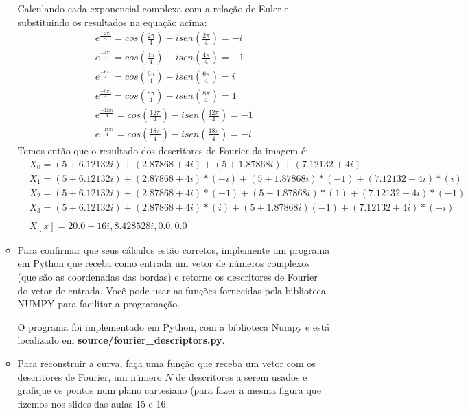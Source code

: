 \documentclass[12pt]{article}
\begin{document}
\begin{itemize}
\begin{itemize}
Calculando cada exponencial complexa com a relação de Euler e substituindo os resultados na equação acima:
\begin{align*}
    &e^{\frac{-2\pi i}{4}} = cos(\frac{2\pi}{4}) - isen(\frac{2\pi}{4}) = -i &\\
    &e^{\frac{-4\pi i}{4}} = cos(\frac{4\pi}{4}) - isen(\frac{4\pi}{4}) = -1 &\\
    &e^{\frac{-6\pi i}{4}} = cos(\frac{6\pi}{4}) - isen(\frac{6\pi}{4}) = i &\\
    &e^{\frac{-8\pi i}{4}} = cos(\frac{8\pi}{4}) - isen(\frac{8\pi}{4}) = 1 &\\
    &e^{\frac{-12\pi i}{4}} = cos(\frac{12\pi}{4}) - isen(\frac{12\pi}{4}) = -1 &\\
    &e^{\frac{-18\pi i}{4}} = cos(\frac{18\pi}{4}) - isen(\frac{18\pi}{4}) = -i &
\end{align*}
Temos então que o resultado dos descritores de Fourier da imagem é:
\begin{align*}
    &X_0 = (5 + 6.12132i) + (2.87868 + 4i) + (5 + 1.87868i) + (7.12132 + 4i) &\\
    &X_1 = (5 + 6.12132i) + (2.87868 + 4i)*(-i) + (5 + 1.87868i)*(-1) + (7.12132 + 4i)*(i) &\\
    &X_2 = (5 + 6.12132i) + (2.87868 + 4i)*(-1) + (5 + 1.87868i)*(1) + (7.12132 + 4i)*(-1) &\\
    &X_3 = (5 + 6.12132i) + (2.87868 + 4i)*(i) + (5 + 1.87868i)(-1) + (7.12132 + 4i)*(-i) &\\
    \\
    &X[x] = 20.0 + 16i,  8.428528i, 0.0, 0.0&
\end{align*}
     
\item Para confirmar que seus cálculos estão corretos, implemente um
  programa em Python que receba como entrada um vetor de números
  complexos (que são as coordenadas das bordas) e retorne os
  descritores de Fourier do vetor de entrada. Você pode usar as
  funções fornecidas pela biblioteca NUMPY para facilitar a
  programação.
  
O programa foi implementado em Python, com a biblioteca Numpy e está localizado em \textbf{source/fourier\_descriptors.py}.\\

\item Para reconstruir a curva, faça uma função que receba um vetor
  com os descritores de Fourier, um número $N$ de descritores a serem
  usados e grafique os pontos num plano cartesiano (para fazer a mesma 
figura que fizemos nos slides das aulas 15 e 16.


\end{itemize}
\end{itemize}
\end{document}
